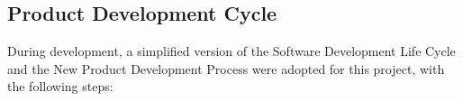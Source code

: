 \documentclass{article}
\begin{document}
\begin{figure}[h!]
\end{figure}

\subsection{Product Development Cycle}

During development, a simplified version of the Software Development Life Cycle and the New Product Development Process were adopted for this project, with the following steps:
\end{document}
